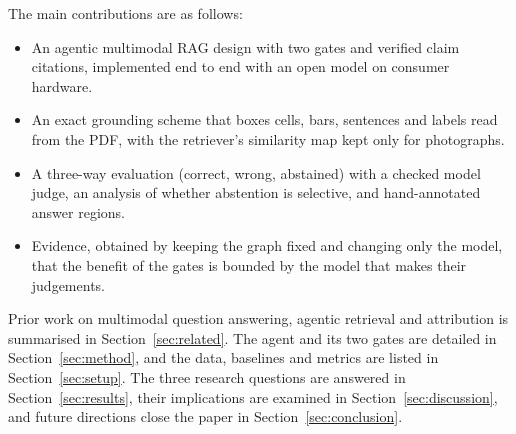 The main contributions are as follows:
\begin{itemize}
    \item An agentic multimodal RAG design with two gates and verified claim
    citations, implemented end to end with an open model on consumer hardware.
    \item An exact grounding scheme that boxes cells, bars, sentences and labels read
    from the PDF, with the retriever's similarity map kept only for photographs.
    \item A three-way evaluation (correct, wrong, abstained) with a checked model judge,
    an analysis of whether abstention is selective, and hand-annotated answer regions.
    \item Evidence, obtained by keeping the graph fixed and changing only the model,
    that the benefit of the gates is bounded by the model that makes their judgements.
\end{itemize}

Prior work on multimodal question answering, agentic retrieval and attribution is
summarised in Section~\ref{sec:related}. The agent and its two gates are detailed in
Section~\ref{sec:method}, and the data, baselines and metrics are listed in
Section~\ref{sec:setup}. The three research questions are answered in
Section~\ref{sec:results}, their implications are examined in
Section~\ref{sec:discussion}, and future directions close the paper in
Section~\ref{sec:conclusion}.
